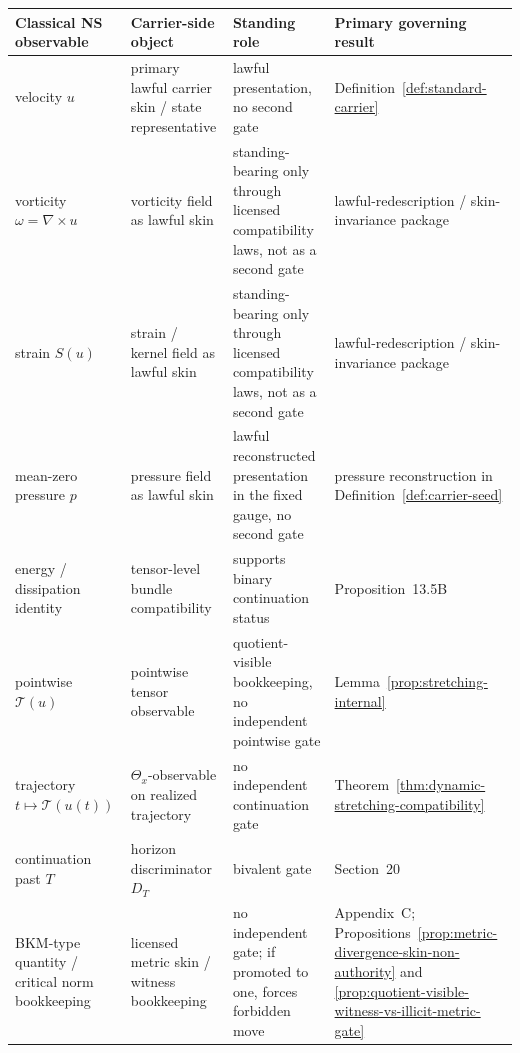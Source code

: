 \begin{table}[t]
\centering
\small
\setlength{\tabcolsep}{5pt}
\renewcommand{\arraystretch}{1.18}
\begin{tabular}{>{\raggedright\arraybackslash}p{} >{\raggedright\arraybackslash}p{} >{\raggedright\arraybackslash}p{} >{\raggedright\arraybackslash}p{}}
\toprule
\textbf{Classical NS observable} & \textbf{Carrier-side object} & \textbf{Standing role} & \textbf{Primary governing result} \\
\midrule
velocity $u$ & primary lawful carrier skin / state representative & lawful presentation, no second gate & Definition~\ref{def:standard-carrier} \\
\addlinespace
vorticity $\omega=\nabla\times u$ & vorticity field as lawful skin & standing-bearing only through licensed compatibility laws, not as a second gate & lawful-redescription / skin-invariance package \\
\addlinespace
strain $S(u)$ & strain / kernel field as lawful skin & standing-bearing only through licensed compatibility laws, not as a second gate & lawful-redescription / skin-invariance package \\
\addlinespace
mean-zero pressure $p$ & pressure field as lawful skin & lawful reconstructed presentation in the fixed gauge, no second gate & pressure reconstruction in Definition~\ref{def:carrier-seed} \\
\addlinespace
energy / dissipation identity & tensor-level bundle compatibility & supports binary continuation status & Proposition~13.5B \\
\addlinespace
pointwise $\mathcal T(u)$ & pointwise tensor observable & quotient-visible bookkeeping, no independent pointwise gate & Lemma~\ref{prop:stretching-internal} \\
\addlinespace
trajectory $t\mapsto \mathcal T(u(t))$ & $\Theta_x$-observable on realized trajectory & no independent continuation gate & Theorem~\ref{thm:dynamic-stretching-compatibility} \\
\addlinespace
continuation past $T$ & horizon discriminator $D_T$ & bivalent gate & Section~20 \\
\addlinespace
BKM-type quantity / critical norm bookkeeping & licensed metric skin / witness bookkeeping & no independent gate; if promoted to one, forces forbidden move & Appendix~C; Propositions~\ref{prop:metric-divergence-skin-non-authority} and \ref{prop:quotient-visible-witness-vs-illicit-metric-gate} \\

\end{tabular}
\end{table}
